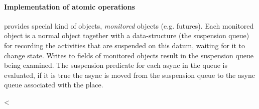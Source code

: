 \paragraph{Implementation of atomic operations}
{}\Xtenlib{} provides special kind of objects, {\em monitored} objects
(e.g.{} futures). Each monitored object is a normal \Xten{} object
together with a data-structure (the suspension queue) for recording
the activities that are suspended on this datum, waiting for it to
change state. Writes to fields of monitored objects result in the
suspension queue being examined. The suspension predicate for each
async in the queue is evaluated, if it is true the async is moved from
the suspension queue to the async queue associated with the place.

<%




